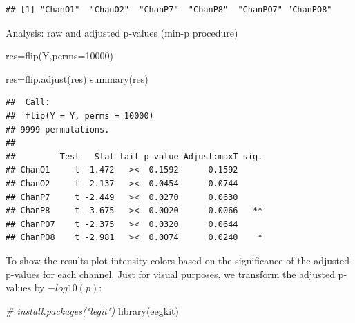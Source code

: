 \documentclass[
]{article}
\newenvironment{Shaded}{\begin{snugshade}}{\end{snugshade}}
\newcommand{\AttributeTok}[1]{\textcolor[rgb]{0.77,0.63,0.00}{#1}}
\newcommand{\CommentTok}[1]{\textcolor[rgb]{0.56,0.35,0.01}{\textit{#1}}}
\newcommand{\DecValTok}[1]{\textcolor[rgb]{0.00,0.00,0.81}{#1}}
\newcommand{\FunctionTok}[1]{\textcolor[rgb]{0.00,0.00,0.00}{#1}}
\newcommand{\NormalTok}[1]{#1}
\newcommand{\OtherTok}[1]{\textcolor[rgb]{0.56,0.35,0.01}{#1}}
\newcommand{\SpecialCharTok}[1]{\textcolor[rgb]{0.00,0.00,0.00}{#1}}
\newcommand{\StringTok}[1]{\textcolor[rgb]{0.31,0.60,0.02}{#1}}
\begin{document}
\begin{Shaded}
\end{Shaded}

\begin{verbatim}
## [1] "ChanO1"  "ChanO2"  "ChanP7"  "ChanP8"  "ChanPO7" "ChanPO8"
\end{verbatim}

Analysis: raw and adjusted p-values (min-p procedure)

\begin{Shaded}
\begin{Highlighting}[]
\NormalTok{res}\OtherTok{=}\FunctionTok{flip}\NormalTok{(Y,}\AttributeTok{perms=}\DecValTok{10000}\NormalTok{)}

\NormalTok{res}\OtherTok{=}\FunctionTok{flip.adjust}\NormalTok{(res)}
\FunctionTok{summary}\NormalTok{(res)}
\end{Highlighting}
\end{Shaded}

\begin{verbatim}
##  Call:
##  flip(Y = Y, perms = 10000) 
## 9999 permutations.
## 
##         Test   Stat tail p-value Adjust:maxT sig.
## ChanO1     t -1.472   ><  0.1592      0.1592     
## ChanO2     t -2.137   ><  0.0454      0.0744     
## ChanP7     t -2.449   ><  0.0270      0.0630     
## ChanP8     t -3.675   ><  0.0020      0.0066   **
## ChanPO7    t -2.375   ><  0.0320      0.0644     
## ChanPO8    t -2.981   ><  0.0074      0.0240    *
\end{verbatim}

To show the results plot intensity colors based on the significance of
the adjusted p-values for each channel. Just for visual purposes, we
transform the adjusted p-values by \(-log10(p)\):

\begin{Shaded}
\begin{Highlighting}[]
\CommentTok{\# install.packages("legit")}
\FunctionTok{library}\NormalTok{(eegkit)}
\end{Highlighting}
\end{Shaded}
\end{document}
